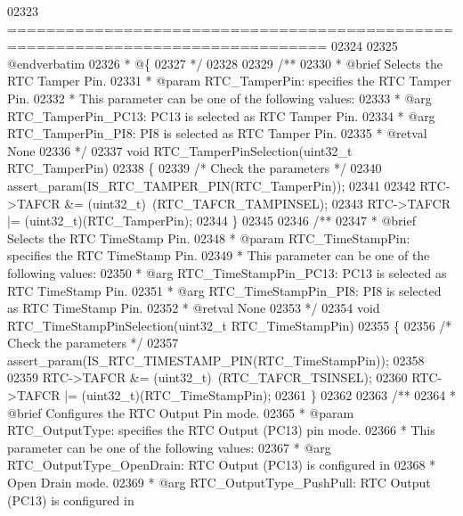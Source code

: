 \begin{DoxyCode}
02323 \textcolor{comment}{ ===============================================================================  }
02324 \textcolor{comment}{}
02325 \textcolor{comment}{@endverbatim}
02326 \textcolor{comment}{  * @\{}
02327 \textcolor{comment}{  */}
02328 
02329 \textcolor{comment}{/**}
02330 \textcolor{comment}{  * @brief  Selects the RTC Tamper Pin.}
02331 \textcolor{comment}{  * @param  RTC\_TamperPin: specifies the RTC Tamper Pin.}
02332 \textcolor{comment}{  *          This parameter can be one of the following values:}
02333 \textcolor{comment}{  *            @arg RTC\_TamperPin\_PC13: PC13 is selected as RTC Tamper Pin.}
02334 \textcolor{comment}{  *            @arg RTC\_TamperPin\_PI8: PI8 is selected as RTC Tamper Pin.    }
02335 \textcolor{comment}{  * @retval None}
02336 \textcolor{comment}{  */}
02337 \textcolor{keywordtype}{void} RTC_TamperPinSelection(uint32\_t RTC\_TamperPin)
02338 \{
02339   \textcolor{comment}{/* Check the parameters */}
02340   assert_param(IS\_RTC\_TAMPER\_PIN(RTC\_TamperPin));
02341 
02342   RTC->TAFCR &= (uint32\_t)~(RTC_TAFCR_TAMPINSEL);
02343   RTC->TAFCR |= (uint32\_t)(RTC\_TamperPin);
02344 \}
02345 
02346 \textcolor{comment}{/**}
02347 \textcolor{comment}{  * @brief  Selects the RTC TimeStamp Pin.}
02348 \textcolor{comment}{  * @param  RTC\_TimeStampPin: specifies the RTC TimeStamp Pin.}
02349 \textcolor{comment}{  *          This parameter can be one of the following values:}
02350 \textcolor{comment}{  *            @arg RTC\_TimeStampPin\_PC13: PC13 is selected as RTC TimeStamp Pin.}
02351 \textcolor{comment}{  *            @arg RTC\_TimeStampPin\_PI8: PI8 is selected as RTC TimeStamp Pin.    }
02352 \textcolor{comment}{  * @retval None}
02353 \textcolor{comment}{  */}
02354 \textcolor{keywordtype}{void} RTC_TimeStampPinSelection(uint32\_t RTC\_TimeStampPin)
02355 \{
02356   \textcolor{comment}{/* Check the parameters */}
02357   assert_param(IS\_RTC\_TIMESTAMP\_PIN(RTC\_TimeStampPin));
02358 
02359   RTC->TAFCR &= (uint32\_t)~(RTC_TAFCR_TSINSEL);
02360   RTC->TAFCR |= (uint32\_t)(RTC\_TimeStampPin);
02361 \}
02362 
02363 \textcolor{comment}{/**}
02364 \textcolor{comment}{  * @brief  Configures the RTC Output Pin mode. }
02365 \textcolor{comment}{  * @param  RTC\_OutputType: specifies the RTC Output (PC13) pin mode.}
02366 \textcolor{comment}{  *          This parameter can be one of the following values:}
02367 \textcolor{comment}{  *            @arg RTC\_OutputType\_OpenDrain: RTC Output (PC13) is configured in }
02368 \textcolor{comment}{  *                                    Open Drain mode.}
02369 \textcolor{comment}{  *            @arg RTC\_OutputType\_PushPull:  RTC Output (PC13) is configured in }

\end{DoxyCode}
